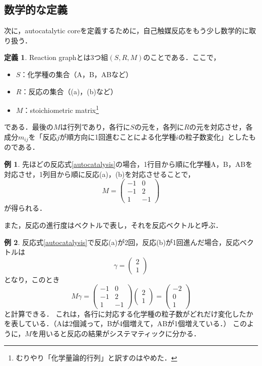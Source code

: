 \documentclass[a4paper,11pt]{jsarticle}
\theoremstyle{definition}
\newtheorem{dfn}{定義}
\newtheorem{ex}{例}
\begin{document}
\subsection{数学的な定義}
次に，autocatalytic coreを定義するために，自己触媒反応をもう少し数学的に取り扱う．

\begin{dfn}
  \label{reaction_graph}
  Reaction graphとは3つ組$(S,R,M)$のことである．ここで，
  \begin{itemize}
    \item $S$：化学種の集合（A，B，ABなど）
    \item $R$：反応の集合（(a)，(b)など）
    \item $M$：stoichiometric matrix\footnote{むりやり「化学量論的行列」と訳すのはやめた．} 
  \end{itemize}
  である．最後の$M$は行列であり，各行に$S$の元を，各列に$R$の元を対応させ，各成分$m_{ij}$を「反応$j$が順方向に1回進むことによる化学種$i$の粒子数変化」としたものである．
\end{dfn}
\begin{ex}
  先ほどの反応式\eqref{autocatalysis}の場合，1行目から順に化学種A，B，ABを対応させ，1列目から順に反応(a)，(b)を対応させることで，
\begin{equation}
  M = \left( \begin{matrix}
    -1 & 0 \\
    -1 & 2 \\
    1 & -1 
  \end{matrix}
  \right)
\end{equation}
が得られる．
\end{ex}


また，反応の進行度はベクトルで表し，それを反応ベクトルと呼ぶ．
\begin{ex}
  反応式\eqref{autocatalysis}で反応(a)が2回，反応(b)が1回進んだ場合，反応ベクトルは
\begin{equation}
  \gamma = \left( \begin{matrix}
    2 \\
    1
  \end{matrix}\right)
\end{equation}
となり，このとき
\begin{equation}
  M \gamma = \left( \begin{matrix}
    -1 & 0 \\
    -1 & 2 \\
    1 & -1 
  \end{matrix}
  \right) 
  \left( \begin{matrix}
    2 \\
    1
  \end{matrix}\right)
  = \left(
    \begin{matrix}
      -2 \\
      0 \\
      1
    \end{matrix}
  \right)
\end{equation}
と計算できる．
これは，各行に対応する化学種の粒子数がどれだけ変化したかを表している．（Aは2個減って，Bが4個増えて，ABが1個増えている．）
このように，$M$を用いると反応の結果がシステマティックに分かる．
\end{ex}
\end{document}
